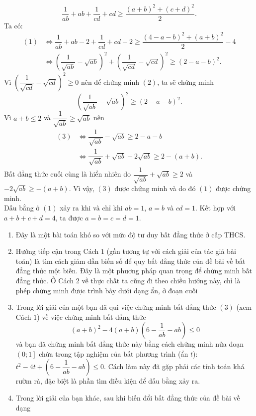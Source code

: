 \begin{bt}
{\[\dfrac{1}{ab}+ab +\dfrac{1}{cd}+cd \geq \dfrac{(a+b)^2+(c+d)^2}{2}. \tag{1}\]
Ta có: 
	{\allowdisplaybreaks
	\begin{align*}
	(1)&\Leftrightarrow \dfrac{1}{ab}+ab-2+\dfrac{1}{cd}+cd-2\geq \dfrac{(4-a-b)^2+(a+b)^2}{2}-4\\
	 &\Leftrightarrow \left(\dfrac{1}{\sqrt{ab}}-\sqrt{ab} \right)^2+\left( \dfrac{1}{\sqrt{cd}}-\sqrt{cd}\right)^2\geq (2-a-b)^2. \tag{2} 
		\end{align*}}Vì $\left( \dfrac{1}{\sqrt{cd}}-\sqrt{cd}\right)^2 \geq 0 $ nên để chứng minh $(2)$, ta sẽ chứng minh
	\[\left( \dfrac{1}{\sqrt{ab}}-\sqrt{ab}\right)^2\geq (2-a-b)^2 . \tag{3}\]
	Vì $a+b \leq 2$ và $\dfrac{1}{\sqrt{ab}}\geq \sqrt{ab}$ nên 
		{\allowdisplaybreaks
		\begin{align*}
		(3)& \Leftrightarrow \dfrac{1}{\sqrt{ab}}-\sqrt{ab}\geq 2-a-b\\
		&\Leftrightarrow \dfrac{1}{\sqrt{ab}}+\sqrt{ab}-2\sqrt{ab}\geq 2-(a+b).
			\end{align*}}Bất đẳng thức cuối cùng là hiển nhiên do
		$\dfrac{1}{\sqrt{ab}}+\sqrt{ab}\geq 2$ và $-2\sqrt{ab}\geq -(a+b)$.
		Vì vậy, $(3)$ được chứng minh và do đó $(1)$ được chứng minh.\\
		Dấu bằng ở $(1)$ xảy ra khi và chỉ khi $ab=1$, $a=b$ và $cd=1$. Kết hợp với $a+b+c+d=4$, ta được $a=b=c=d=1$.
\begin{nx}\hfill
\begin{enumerate}[1.]
	\item Đây là một bài toán khó so  với mức độ tư duy  bất đẳng thức ở cấp THCS.
	\item Hướng tiếp cận trong Cách $ 1 $ (gần tương tự với cách giải của tác giả bài toán) là tìm cách giảm dần biến số để quy bất đẳng thức của đề bài về bất đẳng thức một biến. Đây là một phương pháp quan trọng để chứng minh bất đẳng thức. Ở Cách $ 2 $ về thực chất ta cũng đi theo chiều hướng này, chỉ là phép chứng minh được trình bày dưới dạng ẩn, ở đoạn cuối
	\item Trong lời giải của một bạn đã qui việc chứng minh bất đẳng thức $(3)$ (xem Cách $1$) về việc chứng minh bất đẳng thức
	\[(a+b)^2-4(a+b)\left( 6-\dfrac{1}{ab}-ab\right)\leq 0 \]
	và bạn đã chứng minh bất đẳng thức này bằng cách chứng minh nửa đoạn $\left( 0;1\right] $ chứa trong tập nghiệm của bất phương trình (ẩn $t$): $t^2-4t+\left( 6-\dfrac{1}{ab}-ab \right) \leq 0$. Cách làm này đã gặp phải các tính toán khá rườm rà, đặc biệt là phần tìm điều kiện để dấu bằng xảy ra.
	\item Trong lời giải của bạn khác, sau khi biến đổi bất đẳng thức của đề bài về dạng

\end{enumerate}
\end{nx}}
\end{bt}
